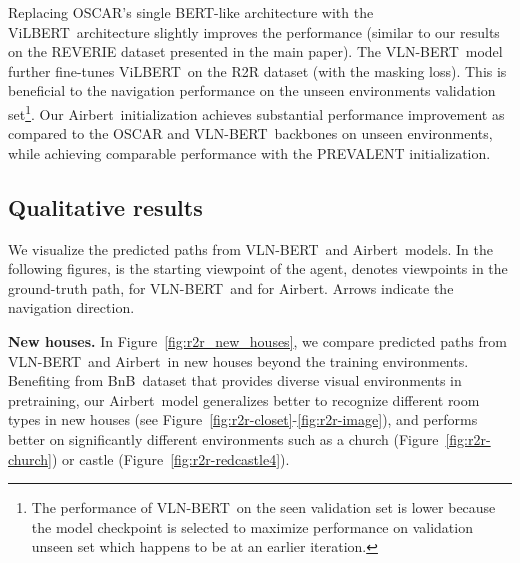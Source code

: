 \RequirePackage[dvipsnames,table]{xcolor} \documentclass[10pt,twocolumn,letterpaper]{article}
\newcommand{\p}[1]{\vspace{1mm}\noindent\textbf{#1}}
\newcommand{\vilbert}{ViLBERT}
\newcommand{\vlnbert}{VLN-BERT}
\newcommand{\airbert}{Airbert}
\newcommand{\airbnb}{BnB}
\newcommand{\start}{\ding{108}}
\newcommand{\final}{\ding{110}}
\begin{document}
Replacing OSCAR's single BERT-like architecture with the \vilbert~architecture slightly improves the performance (similar to our results on the REVERIE dataset presented in the main paper).
The \vlnbert~model further fine-tunes \vilbert~on the R2R dataset (with the masking loss).
This is beneficial to the navigation performance on the unseen environments validation set\footnote{The performance of \vlnbert~on the seen validation set is lower because the model checkpoint is selected to maximize performance on validation unseen set which happens to be at an earlier iteration.}.
Our \airbert~initialization achieves substantial performance improvement as compared to the OSCAR and \vlnbert~backbones on unseen environments, while achieving comparable performance with the PREVALENT initialization.



\subsection{Qualitative results}
\newcommand{\gfinal}{{\textcolor{SeaGreen}\final}}
\newcommand{\pfinal}{{\color{Orchid}\final}}
\newcommand{\bfinal}{{\color{cyan}\final}}

We visualize the predicted paths from \vlnbert~and \airbert~models.
In the following figures, {\color{yellow}\start{}} is the starting viewpoint of the agent, \gfinal{} denotes viewpoints in the ground-truth path, \pfinal{} for \vlnbert~and \bfinal{} for \airbert. Arrows indicate the navigation direction.


\p{New houses.}
In Figure~\ref{fig:r2r_new_houses}, we compare predicted paths from \vlnbert~and \airbert~in new houses beyond the training environments.
Benefiting from \airbnb~dataset that provides diverse visual environments in pretraining, our \airbert~model generalizes better to recognize different room types in new houses (see Figure~\ref{fig:r2r-closet}-\ref{fig:r2r-image}), and performs better on significantly different environments such as a church (Figure~\ref{fig:r2r-church}) or castle (Figure~\ref{fig:r2r-redcastle4}).
\end{document}
